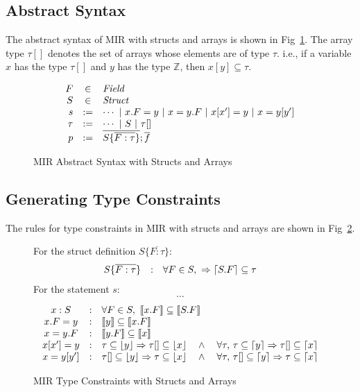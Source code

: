 \documentclass[peerreview, 10pt]{IEEEtran}
\newcommand{\Z}{\ensuremath{\mathbb{Z}}}
\newcommand{\cons}[1]{\ensuremath{\llbracket#1\rrbracket}}
\newcommand{\floor}[1]{\ensuremath{\lfloor#1\rfloor}}
\newcommand{\ceil}[1]{\ensuremath{\lceil#1\rceil}}
\newcommand{\ifrule}[2]{\ensuremath{#1&:&#2}}
\begin{document}
\subsection{Abstract Syntax}
The abstract syntax of MIR with structs and arrays is shown in Fig~\ref{fig:mir-structs-arrays-absyn}. The array type $\tau[]$ denotes the set of arrays whose elements are of type $\tau$. i.e., if a variable $x$ has the type $\tau[]$ and $y$ has the type $\Z$, then $x[y]\subseteq\tau$.
\begin{figure}[ht]
\centering
\begin{framed}
\[
  \begin{array}{@{}rcl@{}}
    F &\in& \mathit{Field} \\
    S &\in& \mathit{Struct} \\
    s &:=& \cdots\ |\ x.F=y\ |\ x=y.F\ |\ x[x']=y\ |\ x=y[y'] \\
    \tau &:=& \cdots\ |\ S\ |\ \tau[] \\
    p &:=& \overline{S \{ \overline{F:\tau} \}}; \overline{f} \\
  \end{array}
\]
\end{framed}
\caption{MIR Abstract Syntax with Structs and Arrays}
\label{fig:mir-structs-arrays-absyn}
\end{figure}

\subsection {Generating Type Constraints}

The rules for type constraints in MIR with structs and arrays are shown in Fig~\ref{fig:mir-structs-arrays-type-constraints}.

\begin{figure}[ht]
\begin{framed}
For the struct definition $S \{ \overline{F:\tau} \}$:
\[
\begin{array}{@{}ccl@{}}
  \ifrule{S \{ \overline{F:\tau} \}}{\forall F\in S,\ \Rightarrow \ceil{S.F} \subseteq \tau}
\end{array}
\]
For the statement $s$:
\[\cdots\]
\[
\begin{array}{@{}ccl@{}}
  \ifrule{x:S}{\forall F\in S,\ \cons{x.F}\subseteq\cons{S.F}}\\
  \ifrule{x.F=y}{\cons{y} \subseteq \cons{x.F}}\\
  \ifrule{x=y.F}{\cons{y.F} \subseteq \cons{x}}\\
  \ifrule{x[x']=y}{\tau\subseteq\floor{y}\Rightarrow\tau[]\subseteq\floor{x}\quad\land\quad\forall\tau,\,\tau\subseteq\ceil{y}\Rightarrow\tau[]\subseteq\ceil{x}}\\
  \ifrule{x=y[y']}{\tau[]\subseteq\floor{y}\Rightarrow\tau\subseteq\floor{x}\quad\land\quad\forall\tau,\,\tau[]\subseteq\ceil{y}\Rightarrow\tau\subseteq\ceil{x}}
\end{array}
\]
\end{framed}
\caption{MIR Type Constraints with Structs and Arrays}
\label{fig:mir-structs-arrays-type-constraints}
\end{figure}
\end{document}
